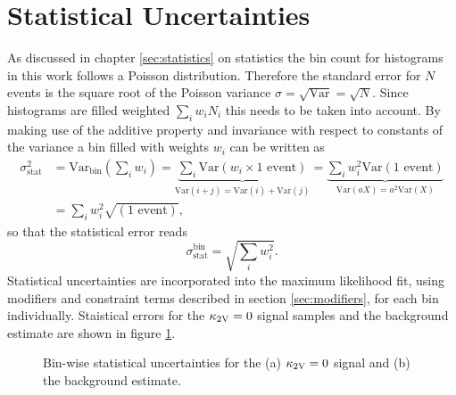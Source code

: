 \section{Statistical Uncertainties}
As discussed in chapter \ref{sec:statistics} on statistics the bin count for histograms in this work follows a Poisson distribution. Therefore the standard error for $N$ events is the square root of the Poisson variance $\sigma=\sqrt{\text{Var}}=\sqrt{N}$. Since histograms are filled weighted $\sum_i w_i N_i$ this needs to be taken into account. By making use of the additive property and invariance with respect to constants of the variance a bin filled with weights $w_i$ can be written as
\begin{align}
    \sigma_\text{stat}^2 & = \text{Var}_\text{bin}\left(\sum_i w_i\right)
    =
    \underbrace{\sum_i \text{Var}(w_i \times 1\text{ event})}_{\text{Var}(i+j)=\text{Var}(i)+\text{Var}(j)}
    =
    \underbrace{\sum_i w_i^2\text{Var}(1\text{ event})}_{\text{Var}(aX)=a^2\text{Var}(X)} \\ \nonumber
                         & =\sum_i w_i^2\sqrt{(1\text{ event})},
\end{align}
so that the statistical error reads
\begin{equation}
    \sigma_\text{stat}^\text{bin}=\sqrt{\sum_i w_i^2}.
\end{equation}
Statistical uncertainties are incorporated into the maximum likelihood fit, using modifiers and constraint terms described in section \ref{sec:modifiers}, for each bin individually. Staistical errors for the $\kappa_{\text{2V}}=0$ signal samples and the background estimate are shown in figure \ref{fig:stat_unc}.

\begin{figure}
    \centering
    \caption[]{Bin-wise statistical uncertainties for the (a) $\kappa_{\text{2V}}=0$ signal and (b) the background estimate.}
    \label{fig:stat_unc}
\end{figure}



